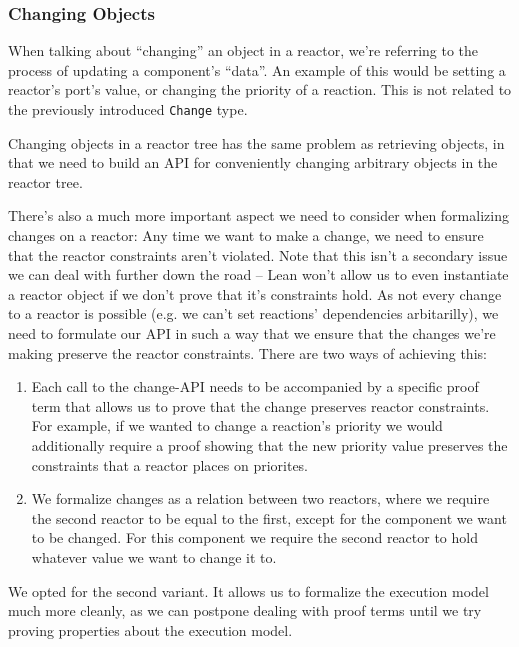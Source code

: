 \subsubsection{Changing Objects}
\label{sec:changing-objects}

When talking about ``changing'' an object in a reactor, we're referring to the process of updating a component's ``data''.
An example of this would be setting a reactor's port's value, or changing the priority of a reaction.
This is not related to the previously introduced \lstinline{Change} type.

Changing objects in a reactor tree has the same problem as retrieving objects, in that we need to build an API for conveniently changing arbitrary objects in the reactor tree.

There's also a much more important aspect we need to consider when formalizing changes on a reactor:
Any time we want to make a change, we need to ensure that the reactor constraints aren't violated.
Note that this isn't a secondary issue we can deal with further down the road -- Lean won't allow us to even instantiate a reactor object if we don't prove that it's constraints hold.
As not every change to a reactor is possible (e.g. we can't set reactions' dependencies arbitarilly), we need to formulate our API in such a way that we ensure that the changes we're making preserve the reactor constraints.
There are two ways of achieving this:

\begin{enumerate}
  \item Each call to the change-API needs to be accompanied by a specific proof term that allows us to prove that the change preserves reactor constraints.
        For example, if we wanted to change a reaction's priority we would additionally require a proof showing that the new priority value preserves the constraints that a reactor places on priorites.
  \item We formalize changes as a relation between two reactors, where we require the second reactor to be equal to the first, except for the component we want to be changed. 
        For this component we require the second reactor to hold whatever value we want to change it to.
\end{enumerate}

We opted for the second variant.
It allows us to formalize the execution model much more cleanly, as we can postpone dealing with proof terms until we try proving properties about the execution model.

